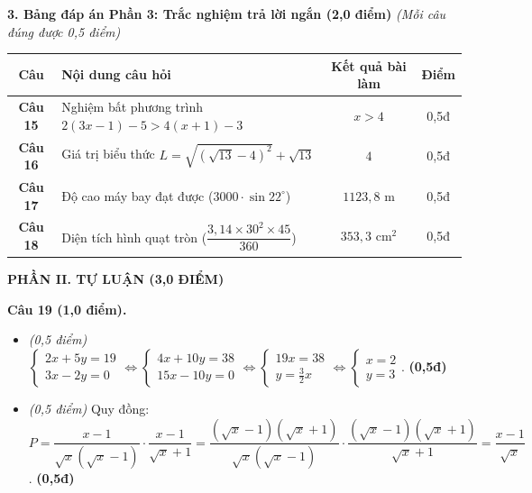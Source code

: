 \documentclass[11pt,a4paper]{article}
\begin{document}
\vspace{2mm}
\noindent
\textbf{3. Bảng đáp án Phần 3: Trắc nghiệm trả lời ngắn (2,0 điểm)} \textit{(Mỗi câu đúng được 0,5 điểm)}
\begin{center}
\begin{tabular}{|c|l|c|c|}
\hline
\textbf{Câu} & \textbf{Nội dung câu hỏi} & \textbf{Kết quả bài làm} & \textbf{Điểm} \\
\hline
\textbf{Câu 15} & Nghiệm bất phương trình $2(3x - 1) - 5 > 4(x + 1) - 3$ & \textbf{$x > 4$} & 0,5đ \\
\hline
\textbf{Câu 16} & Giá trị biểu thức $L = \sqrt{(\sqrt{13}-4)^2} + \sqrt{13}$ & \textbf{$4$} & 0,5đ \\
\hline
\textbf{Câu 17} & Độ cao máy bay đạt được ($3000 \cdot \sin 22^\circ$) & \textbf{$1123{,}8\text{ m}$} & 0,5đ \\
\hline
\textbf{Câu 18} & Diện tích hình quạt tròn ($\dfrac{3{,}14 \times 30^2 \times 45}{360}$) & \textbf{$353{,}3\text{ cm}^2$} & 0,5đ \\
\hline
\end{tabular}
\end{center}

\vspace{3mm}
\noindent
\textbf{\large PHẦN II. TỰ LUẬN (3,0 ĐIỂM)}

\vspace{2mm}
\textbf{Câu 19 (1,0 điểm).}
\begin{itemize}
  \item[a)] \textit{(0,5 điểm)} $\begin{cases} 2x + 5y = 19 \\ 3x - 2y = 0 \end{cases} \Leftrightarrow \begin{cases} 4x + 10y = 38 \\ 15x - 10y = 0 \end{cases} \Leftrightarrow \begin{cases} 19x = 38 \\ y = \frac{3}{2}x \end{cases} \Leftrightarrow \begin{cases} x = 2 \\ y = 3 \end{cases}$. \hfill \textbf{(0,5đ)}
  \item[b)] \textit{(0,5 điểm)} Quy đồng: $P = \dfrac{x - 1}{\sqrt{x}(\sqrt{x}-1)} \cdot \dfrac{x-1}{\sqrt{x}+1} = \dfrac{(\sqrt{x}-1)(\sqrt{x}+1)}{\sqrt{x}(\sqrt{x}-1)} \cdot \dfrac{(\sqrt{x}-1)(\sqrt{x}+1)}{\sqrt{x}+1} = \dfrac{x - 1}{\sqrt{x}}$. \hfill \textbf{(0,5đ)}
\end{itemize}
\end{document}
